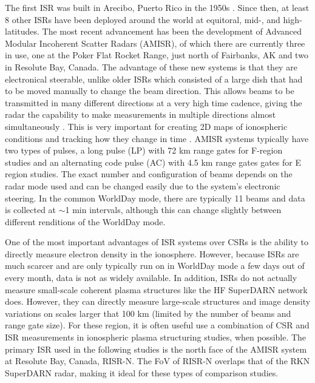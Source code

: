 The first ISR was built in Arecibo, Puerto Rico in the 1950s \citep{Gordon1958}.  Since then, at least 8 other ISRs have been deployed around the world at equitoral, mid-, and high-latitudes.  The most recent advancement has been the development of Advanced Modular Incoherent Scatter Radars (AMISR), of which there are currently three in use, one at the Poker Flat Rocket Range, just north of Fairbanks, AK and two in Resolute Bay, Canada.  The advantage of these new systems is that they are electronical steerable, unlike older ISRs which consisted of a large dish that had to be moved manually to change the beam direction.  This allows beams to be transmitted in many different directions at a very high time cadence, giving the radar the capability to make measurements in multiple directions almost simultaneously \citep{Nicolls2007a,Nicolls2007b,Bachivan2010}.  This is very important for creating 2D maps of ionospheric conditions and tracking how they change in time \citep{Semeter2009,Dahlgren2012a,Dahlgren2012b}.  AMISR systems typically have two types of pulses, a long pulse (LP) with 72 km range gates for F-region studies and an alternating code pulse (AC) with 4.5 km range gates gates for E region studies.  The exact number and configuration of beams depends on the radar mode used and can be changed easily due to the system's electronic steering.  In the common WorldDay mode, there are typically 11 beams and data is collected at \(\sim\)1 min intervals, although this can change slightly between different renditions of the WorldDay mode.

One of the most important advantages of ISR systems over CSRs is the ability to directly measure electron density in the ionosphere.  However, because ISRs are much scarcer and are only typically run on in WorldDay mode a few days out of every month, data is not as widely available.  In addition, ISRs do not actually measure small-scale coherent plasma structures like the HF SuperDARN network does.  However, they can directly measure large-scale structures and image density variations on scales larger that 100 km (limited by the number of beams and range gate size).  For these region, it is often useful use a combination of CSR and ISR measurements in ionospheric plasma structuring studies, when possible.  The primary ISR used in the following studies is the north face of the AMISR system at Resolute Bay, Canada, RISR-N.  The FoV of RISR-N overlaps that of the RKN SuperDARN radar, making it ideal for these types of comparison studies.

